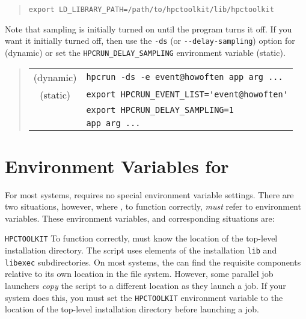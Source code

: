 \begin{quote}
\begin{verbatim}
export LD_LIBRARY_PATH=/path/to/hpctoolkit/lib/hpctoolkit
\end{verbatim}
\end{quote}

Note that sampling is initially turned on until the program turns it
off.  If you want it initially turned off, then use the \verb|-ds| (or
\verb|--delay-sampling|) option for \hpcrun{} (dynamic) or set the
\verb|HPCRUN_DELAY_SAMPLING| environment variable (static).

\begin{quote}
\begin{tabular}{@{}cl}
(dynamic) & \verb|hpcrun -ds -e event@howoften app arg ...|  \\
(static)  & \verb|export HPCRUN_EVENT_LIST='event@howoften'| \\
& \verb|export HPCRUN_DELAY_SAMPLING=1| \\
& \verb|app arg ...|
\end{tabular}
\end{quote}

\section{Environment Variables for \hpcrun{}}
\label{sec:env-vars}
For most systems, \hpcrun{} requires no special environment variable settings.
There are two situations, however, where \hpcrun{}, to function correctly,
\emph{must} refer to environment variables. These environment variables, and
corresponding situations are:
\begin{description}
  \item{\verb|HPCTOOLKIT|} To function correctly, \hpcrun{} must know
       the location of the \HPCToolkit{} top-level installation directory.
       The \hpcrun{} script uses elements of the installation \verb|lib| and
       \verb|libexec| subdirectories. On most systems, the 
       \hpcrun{} can find the requisite
       components relative to its own location in the file system. 
       However, some parallel job launchers \emph{copy} the
       \hpcrun{} script to a different location as they launch a job. If your
       system does this, you must set the \verb|HPCTOOLKIT|
       environment variable to the location of the \HPCToolkit{} top-level installation directory 
       before launching a job.
\end{description}

